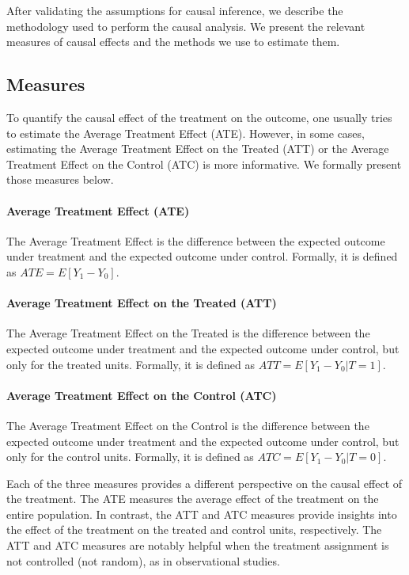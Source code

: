 \documentclass[11pt]{article}
\begin{document}
After validating the assumptions for causal inference, we describe the methodology used to perform the causal analysis. We present the relevant measures of causal effects and the methods we use to estimate them.

\subsection{Measures}

To quantify the causal effect of the treatment on the outcome, one usually tries to estimate the Average Treatment Effect (ATE). However, in some cases, estimating the Average Treatment Effect on the Treated (ATT) or the Average Treatment Effect on the Control (ATC) is more informative. We formally present those measures below.

\paragraph{Average Treatment Effect (ATE)} The Average Treatment Effect is the difference between the expected outcome under treatment and the expected outcome under control. Formally, it is defined as $ATE = E[Y_1 - Y_0]$.

\paragraph{Average Treatment Effect on the Treated (ATT)} The Average Treatment Effect on the Treated is the difference between the expected outcome under treatment and the expected outcome under control, but only for the treated units. Formally, it is defined as $ATT = E[Y_1 - Y_0 | T = 1]$. 

\paragraph{Average Treatment Effect on the Control (ATC)} The Average Treatment Effect on the Control is the difference between the expected outcome under treatment and the expected outcome under control, but only for the control units. Formally, it is defined as $ATC = E[Y_1 - Y_0 | T = 0]$. 

Each of the three measures provides a different perspective on the causal effect of the treatment. The ATE measures the average effect of the treatment on the entire population. In contrast, the ATT and ATC measures provide insights into the effect of the treatment on the treated and control units, respectively. The ATT and ATC measures are notably helpful when the treatment assignment is not controlled (not random), as in observational studies.
\end{document}
